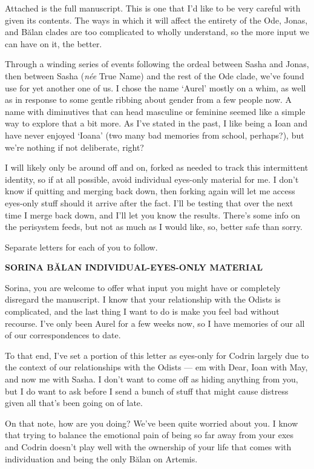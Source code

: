 Attached is the full manuscript. This is one that I'd like to be very careful with given its contents. The ways in which it will affect the entirety of the Ode, Jonas, and Bălan clades are too complicated to wholly understand, so the more input we can have on it, the better.

Through a winding series of events following the ordeal between Sasha and Jonas, then between Sasha (\emph{née} True Name) and the rest of the Ode clade, we've found use for yet another one of us. I chose the name `Aurel' mostly on a whim, as well as in response to some gentle ribbing about gender from a few people now. A name with diminutives that can head masculine or feminine seemed like a simple way to explore that a bit more. As I've stated in the past, I like being a Ioan and have never enjoyed `Ioana' (two many bad memories from school, perhaps?), but we're nothing if not deliberate, right?

I will likely only be around off and on, forked as needed to track this intermittent identity, so if at all possible, avoid individual eyes-only material for me. I don't know if quitting and merging back down, then forking again will let me access eyes-only stuff should it arrive after the fact. I'll be testing that over the next time I merge back down, and I'll let you know the results. There's some info on the perisystem feeds, but not as much as I would like, so, better safe than sorry.

Separate letters for each of you to follow.

\begin{center}
\textbf{SORINA BĂLAN INDIVIDUAL-EYES-ONLY MATERIAL}
\end{center}

Sorina, you are welcome to offer what input you might have or completely disregard the manuscript. I know that your relationship with the Odists is complicated, and the last thing I want to do is make you feel bad without recourse. I've only been Aurel for a few weeks now, so I have memories of our all of our correspondences to date.

To that end, I've set a portion of this letter as eyes-only for Codrin largely due to the context of our relationships with the Odists — em with Dear, Ioan with May, and now me with Sasha. I don't want to come off as hiding anything from you, but I do want to ask before I send a bunch of stuff that might cause distress given all that's been going on of late.

On that note, how are you doing? We've been quite worried about you. I know that trying to balance the emotional pain of being so far away from your exes and Codrin doesn't play well with the ownership of your life that comes with individuation and being the only Bălan on Artemis.


